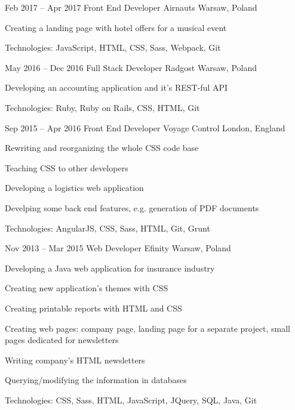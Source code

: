 \begin{sectionlist}
    \sectionlistitemjob
        {Feb 2017 -- Apr 2017}
        {Front End Developer}
        {Airnauts}
        {Warsaw, Poland}
        {
            \begin{joblisting}
                \item Creating a landing page with hotel offers for a musical
                    event
                \item Technologies: JavaScript, HTML, CSS, Sass, Webpack,
                    Git
            \end{joblisting}
        }

    \sectionlistitemjob
        {May 2016 -- Dec 2016}
        {Full Stack Developer}
        {Radgost}
        {Warsaw, Poland}
        {
            \begin{joblisting}
                \item Developing an accounting application and it's REST-ful
                    API
                \item Technologies: Ruby, Ruby on Rails, CSS, HTML, Git
            \end{joblisting}
        }

    \sectionlistitemjob
        {Sep 2015 -- Apr 2016}
        {Front End Developer}
        {Voyage Control}
        {London, England}
        {
            \begin{joblisting}
                \item Rewriting and reorganizing the whole CSS code base
                \item Teaching CSS to other developers
                \item Developing a logistics web application
                \item Develping some back end features, e.g. generation of PDF
                    documents
                \item Technologies: AngularJS, CSS, Sass, HTML, Git, Grunt
            \end{joblisting}
        }

    \sectionlistitemjob
        {Nov 2013 -- Mar 2015}
        {Web Developer}
        {Efinity}
        {Warsaw, Poland}
        {
            \begin{joblisting}
                \item Developing a Java web application for insurance industry
                \item Creating new application's themes with CSS
                \item Creating printable reports with HTML and CSS
                \item Creating web pages: company page, landing page for a separate project, small pages dedicated for newsletters
                \item Writing company's HTML newsletters
                \item Querying/modifying the information in databases
                \item Technologies: CSS, Sass, HTML, JavaScript, JQuery,
                    SQL, Java, Git
            \end{joblisting}
        }


\end{sectionlist}
